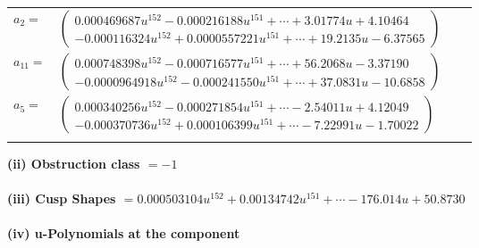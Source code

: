 \documentclass[1p]{elsarticle_modified}
\theoremstyle{definition}
\begin{document}
\begin{tabular}{m{7pt} m{180pt} m{7pt} m{180pt} }
\flushright $a_{2}=$&$\begin{pmatrix}0.000469687 u^{152}-0.000216188 u^{151}+\cdots+3.01774 u+4.10464\\-0.000116324 u^{152}+0.0000557221 u^{151}+\cdots+19.2135 u-6.37565\end{pmatrix}$ \\
\flushright $a_{11}=$&$\begin{pmatrix}0.000748398 u^{152}-0.000716577 u^{151}+\cdots+56.2068 u-3.37190\\-0.0000964918 u^{152}-0.000241550 u^{151}+\cdots+37.0831 u-10.6858\end{pmatrix}$ \\
\flushright $a_{5}=$&$\begin{pmatrix}0.000340256 u^{152}-0.000271854 u^{151}+\cdots-2.54011 u+4.12049\\-0.000370736 u^{152}+0.000106399 u^{151}+\cdots-7.22991 u-1.70022\end{pmatrix}$\\&\end{tabular}
\flushleft \textbf{(ii) Obstruction class $= -1$}\\~\\
\flushleft \textbf{(iii) Cusp Shapes $= 0.000503104 u^{152}+0.00134742 u^{151}+\cdots-176.014 u+50.8730$}\\~\\
\newpage\renewcommand{\arraystretch}{1}
\flushleft \textbf{(iv) u-Polynomials at the component}\newline \\
\end{document}
